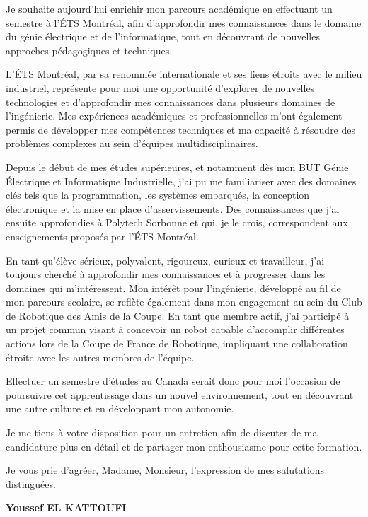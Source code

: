 \documentclass[10pt,a4paper]{article}
\begin{document}
Je souhaite aujourd'hui enrichir mon parcours académique en effectuant un semestre à l'ÉTS Montréal, afin d'approfondir mes connaissances dans le domaine du génie électrique et de l'informatique, tout en découvrant de nouvelles approches pédagogiques et techniques.

L'ÉTS Montréal, par sa renommée internationale et ses liens étroits avec le milieu industriel, représente pour moi une opportunité d'explorer de nouvelles technologies et d'approfondir mes connaissances dans plusieurs domaines de l'ingénierie. Mes expériences académiques et professionnelles m'ont également permis de développer mes compétences techniques et ma capacité à résoudre des problèmes complexes au sein d'équipes multidisciplinaires.

Depuis le début de mes études supérieures, et notamment dès mon BUT Génie Électrique et Informatique Industrielle, j'ai pu me familiariser avec des domaines clés tels que la programmation, les systèmes embarqués, la conception électronique et la mise en place d'asservissements. Des connaissances que j'ai ensuite approfondies à Polytech Sorbonne et qui, je le crois, correspondent aux enseignements proposés par l'ÉTS Montréal.

En tant qu'élève sérieux, polyvalent, rigoureux, curieux et travailleur, j'ai toujours cherché à approfondir mes connaissances et à progresser dans les domaines qui m'intéressent. Mon intérêt pour l'ingénierie, développé au fil de mon parcours scolaire, se reflète également dans mon engagement au sein du Club de Robotique des Amis de la Coupe. En tant que membre actif, j'ai participé à un projet commun visant à concevoir un robot capable d'accomplir différentes actions lors de la Coupe de France de Robotique, impliquant une collaboration étroite avec les autres membres de l'équipe.

Effectuer un semestre d'études au Canada serait donc pour moi l'occasion de poursuivre cet apprentissage dans un nouvel environnement, tout en découvrant une autre culture et en développant mon autonomie.

Je me tiens à votre disposition pour un entretien afin de discuter de ma candidature plus en détail et de partager mon enthousiasme pour cette formation.

Je vous prie d'agréer, Madame, Monsieur, l'expression de mes salutations distinguées.

\vspace{2pt}
{\raggedleft\bfseries\color{bleu}Youssef EL KATTOUFI\par}
\end{document}
